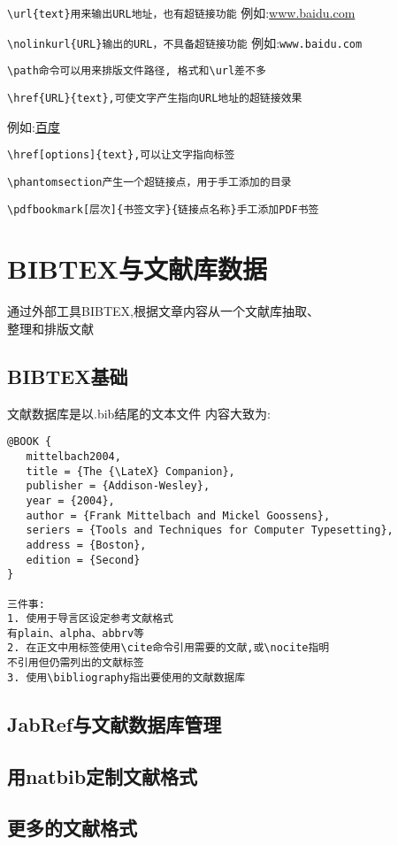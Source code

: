 \documentclass[a4paper, titlepage, hyperref, UTF8]{article}	%
\begin{document}
\verb|\url{text}用来输出URL地址，也有超链接功能|
例如:\url{www.baidu.com}

\verb|\nolinkurl{URL}输出的URL，不具备超链接功能|
例如:\nolinkurl{www.baidu.com}

\verb|\path命令可以用来排版文件路径, 格式和\url差不多|

\verb|\href{URL}{text},可使文字产生指向URL地址的超链接效果|\par
例如:\href{www.baidu.com}{百度}

\verb|\href[options]{text},可以让文字指向标签|\par

\verb|\phantomsection产生一个超链接点，用于手工添加的目录|\par
\verb|\pdfbookmark[层次]{书签文字}{链接点名称}手工添加PDF书签|


\section{BIBTEX与文献库数据}
通过外部工具BIBTEX,根据文章内容从一个文献库抽取、\\
整理和排版文献


\subsection{BIBTEX基础}
文献数据库是以.bib结尾的文本文件
内容大致为:
\begin{verbatim}
@BOOK {
   mittelbach2004,
   title = {The {\LateX} Companion},
   publisher = {Addison-Wesley},
   year = {2004},
   author = {Frank Mittelbach and Mickel Goossens},
   seriers = {Tools and Techniques for Computer Typesetting},
   address = {Boston},
   edition = {Second}
}

三件事:
1. 使用于导言区设定参考文献格式
有plain、alpha、abbrv等
2. 在正文中用标签使用\cite命令引用需要的文献,或\nocite指明
不引用但仍需列出的文献标签
3. 使用\bibliography指出要使用的文献数据库
\end{verbatim}


\subsection{JabRef与文献数据库管理}
\subsection{用natbib定制文献格式}
\subsection{更多的文献格式}
\end{document}
